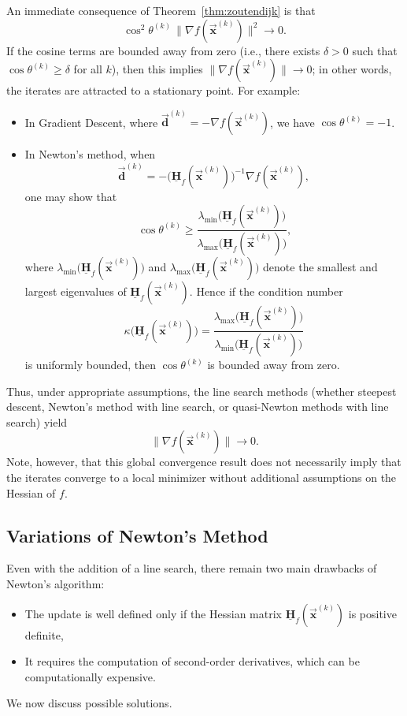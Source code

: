 \documentclass[9pt, headings=standardclasses, parskip=half]{scrartcl}
\newcommand{\matr}[1]{\underline{\boldsymbol{#1}}}
\newcommand{\vect}[1]{\vec{\boldsymbol{#1}}}
\begin{document}
An immediate consequence of Theorem~\ref{thm:zoutendijk} is that
\[
\cos^2\theta^{(k)}\, \|\nabla f(\vect{x}^{(k)})\|^2 \to 0 \text{.}
\]
If the cosine terms are bounded away from zero (i.e., there exists \(\delta > 0\) such that \(\cos\theta^{(k)} \ge \delta\) for all \(k\)), then this implies \(\|\nabla f(\vect{x}^{(k)})\| \to 0\); in other words, the iterates are attracted to a stationary point. For example:
\begin{itemize}
  \item In Gradient Descent, where \(\vect{d}^{(k)} = -\nabla f(\vect{x}^{(k)})\), we have \(\cos\theta^{(k)} = -1\).
  \item In Newton's method, when 
  \[
  \vect{d}^{(k)} = -\big(\matr{H}_{f}(\vect{x}^{(k)})\big)^{-1}\nabla f(\vect{x}^{(k)}),
  \]
  one may show that
    \[
    \cos\theta^{(k)} \ge \frac{\lambda_{\min}\bigl(\matr{H}_{f}(\vect{x}^{(k)})\bigr)}{\lambda_{\max}\bigl(\matr{H}_{f}(\vect{x}^{(k)})\bigr)} \text{,}
    \]
    where \(\lambda_{\min}\bigl(\matr{H}_{f}(\vect{x}^{(k)})\bigr)\) and \(\lambda_{\max}\bigl(\matr{H}_{f}(\vect{x}^{(k)})\bigr)\) denote the smallest and largest eigenvalues of \(\matr{H}_{f}(\vect{x}^{(k)})\). Hence if the condition number 
    \[
    \kappa\bigl(\matr{H}_{f}(\vect{x}^{(k)})\bigr) = \frac{\lambda_{\max}\bigl(\matr{H}_{f}(\vect{x}^{(k)})\bigr)}{\lambda_{\min}\bigl(\matr{H}_{f}(\vect{x}^{(k)})\bigr)}
    \]
    is uniformly bounded, then \(\cos\theta^{(k)}\) is bounded away from zero.
\end{itemize}

Thus, under appropriate assumptions, the line search methods (whether steepest descent, Newton's method with line search, or quasi-Newton methods with line search) yield
\[
\|\nabla f(\vect{x}^{(k)})\| \to 0 \text{.}
\]
Note, however, that this global convergence result does not necessarily imply that the iterates converge to a local minimizer without additional assumptions on the Hessian of \(f\).


\subsection{Variations of Newton's Method}

Even with the addition of a line search, there remain two main drawbacks of Newton's algorithm:
\begin{itemize}
  \item The update is well defined only if the Hessian matrix \(\matr{H}_{f}(\vect{x}^{(k)})\) is positive definite,
  \item It requires the computation of second-order derivatives, which can be computationally expensive.
\end{itemize}
We now discuss possible solutions.
\end{document}
